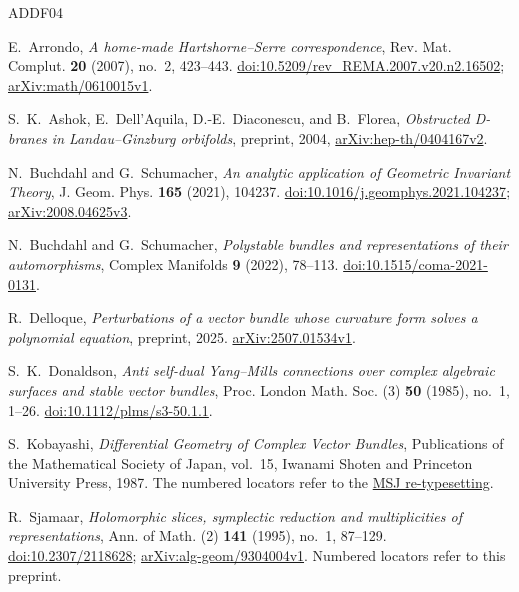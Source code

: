 \begin{thebibliography}{ADDF04}

E.~Arrondo, \emph{A home-made Hartshorne--Serre correspondence},
Rev. Mat. Complut. \textbf{20} (2007), no.~2, 423--443.
\href{https://doi.org/10.5209/rev_REMA.2007.v20.n2.16502}{doi:10.5209/rev\_REMA.2007.v20.n2.16502};
\href{https://arxiv.org/abs/math/0610015v1}{arXiv:math/0610015v1}.

S.~K.~Ashok, E.~Dell'Aquila, D.-E.~Diaconescu, and B.~Florea,
\emph{Obstructed D-branes in Landau--Ginzburg orbifolds},
preprint, 2004,
\href{https://arxiv.org/abs/hep-th/0404167v2}{arXiv:hep-th/0404167v2}.

N.~Buchdahl and G.~Schumacher,
\emph{An analytic application of Geometric Invariant Theory},
J. Geom. Phys. \textbf{165} (2021), 104237.
\href{https://doi.org/10.1016/j.geomphys.2021.104237}{doi:10.1016/j.geomphys.2021.104237};
\href{https://arxiv.org/abs/2008.04625v3}{arXiv:2008.04625v3}.

N.~Buchdahl and G.~Schumacher,
\emph{Polystable bundles and representations of their automorphisms},
Complex Manifolds \textbf{9} (2022), 78--113.
\href{https://doi.org/10.1515/coma-2021-0131}{doi:10.1515/coma-2021-0131}.

R.~Delloque,
\emph{Perturbations of a vector bundle whose curvature form solves a polynomial equation},
preprint, 2025.
\href{https://arxiv.org/abs/2507.01534v1}{arXiv:2507.01534v1}.

S.~K.~Donaldson,
\emph{Anti self-dual Yang--Mills connections over complex algebraic surfaces and stable vector bundles},
Proc. London Math. Soc. (3) \textbf{50} (1985), no.~1, 1--26.
\href{https://doi.org/10.1112/plms/s3-50.1.1}{doi:10.1112/plms/s3-50.1.1}.

S.~Kobayashi, \emph{Differential Geometry of Complex Vector Bundles},
Publications of the Mathematical Society of Japan, vol.~15,
Iwanami Shoten and Princeton University Press, 1987.
The numbered locators refer to the
\href{https://www.mathsoc.jp/assets/pdf/publications/pubmsj/Vol15.pdf}{MSJ re-typesetting}.

R.~Sjamaar,
\emph{Holomorphic slices, symplectic reduction and multiplicities of representations},
Ann. of Math. (2) \textbf{141} (1995), no.~1, 87--129.
\href{https://doi.org/10.2307/2118628}{doi:10.2307/2118628};
\href{https://arxiv.org/abs/alg-geom/9304004v1}{arXiv:alg-geom/9304004v1}.
Numbered locators refer to this preprint.


\end{thebibliography}
